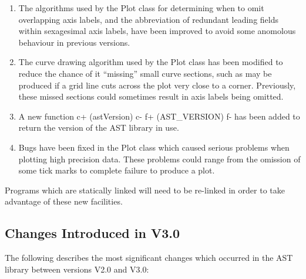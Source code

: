 \documentclass[twoside,11pt]{article}
\begin{document}
\begin{enumerate}
\item The algorithms used by the Plot class for determining when to omit
overlapping axis labels, and the abbreviation of redundant leading fields
within sexagesimal axis labels, have been improved to avoid some anomolous
behaviour in previous versions.

\item The curve drawing algorithm used by the Plot class has been
modified to reduce the chance of it ``missing'' small curve sections,
such as may be produced if a grid line cuts across the plot very close to
a corner. Previously, these missed sections could sometimes result in
axis labels being omitted.

\item A new function
c+
(astVersion)
c-
f+
(AST\_VERSION)
f-
has been added to return the version of the AST library in use.

\item Bugs have been fixed in the Plot class which caused serious problems
when plotting high precision data. These problems could range from the
omission of some tick marks to complete failure to produce a plot.

\end{enumerate}

Programs which are statically linked will need to be re-linked in
order to take advantage of these new facilities.


\subsection{Changes Introduced in V3.0}

The following describes the most significant changes which
occurred in the AST library between versions V2.0 and V3.0:
\end{document}
